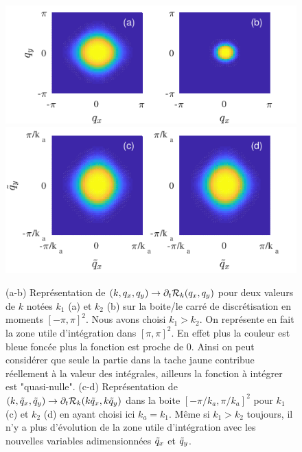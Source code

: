 \documentclass[10.5pt]{article}
\begin{document}
\begin{multicols}{2}
\begin{figure}[H]
\begin{center}
	\includegraphics[width=0.95\columnwidth]{DerRegIsing.pdf}
	\includegraphics[width=0.95\columnwidth, height = 0.4\columnwidth]{DerRegIsing2.pdf}
\end{center}
\caption{(a-b) Représentation  de $(k, q_x, q_y) \to \partial_t \mathcal{R}_k(q_x, q_y)$ pour deux valeurs de  $k$ notées $k_1$ (a) et $k_2$ (b) sur la boite/le carré de discrétisation en moments $[-\pi, \pi]^2$. Nous avons choisi $k_1>k_2$. On représente en fait la zone utile d'intégration dans $[\pi, \pi]^2$. En effet plus la couleur est bleue foncée plus la fonction est proche de 0. Ainsi on peut considérer que seule la partie dans la tache jaune contribue réellement à la valeur des intégrales, ailleurs la fonction à intégrer est "quasi-nulle". (c-d) Représentation de $(k, \tilde{q}_x, \tilde{q}_y) \to \partial_t \mathcal{R}_k(k\tilde{q}_x, k\tilde{q}_y)$ dans la boite $[-\pi/k_a, \pi/k_a]^2$ pour  $k_1$ (c) et $k_2$ (d) en ayant choisi ici $k_a = k_1$. Même si $k_1>k_2$ toujours, il n'y a plus d'évolution de la zone utile d'intégration avec les nouvelles variables adimensionnées $\tilde{q}_x$ et $\tilde{q}_y$.}
\label{fig:DerRegIsing}
\end{figure}


\end{multicols}
\end{document}
